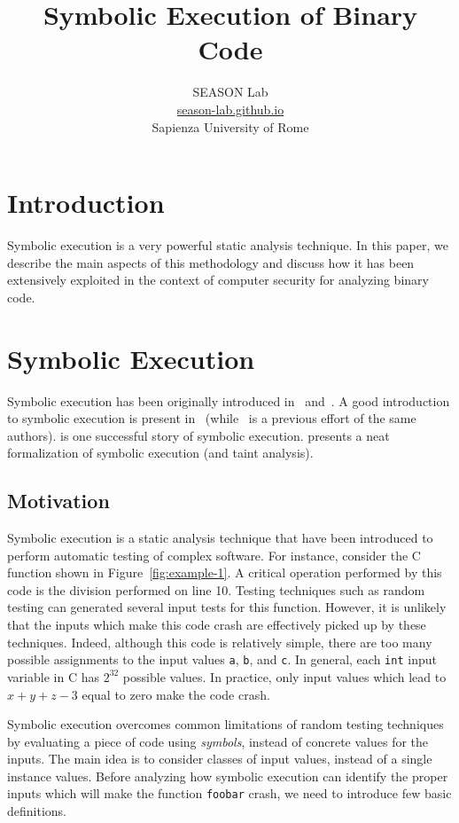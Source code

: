 \documentclass[10pt, a4paper]{article}
\title{Symbolic Execution of Binary Code}
\author{SEASON Lab  \\
\url{season-lab.github.io} \\
Sapienza University of Rome  \\
}
\begin{document}
\maketitle

\setcounter{tocdepth}{2}
\tableofcontents

\newpage
\section{Introduction}

Symbolic execution is a very powerful static analysis technique. In this paper, we describe the main aspects of this methodology and discuss how it has been extensively exploited in the context of computer security for analyzing binary code.

\section{Symbolic Execution}

Symbolic execution has been originally introduced in~\cite{K-ACM76} and~\cite{H-TSE77}. A good introduction to symbolic execution is present in~\cite{KLEE-OSDI08} (while~\cite{EXE-CCS06} is a previous effort of the same authors). \cite{SAGE-NDSS08} is one successful story of symbolic execution. \cite{SAB-SP10} presents a neat formalization of symbolic execution (and taint analysis).

\subsection{Motivation}

Symbolic execution is a static analysis technique that have been introduced to perform automatic testing of complex software. For instance, consider the C function shown in Figure~\ref{fig:example-1}. A critical operation performed by this code is the division performed on line 10. Testing techniques such as random testing can generated several input tests for this function. However, it is unlikely that the inputs which make this code crash are effectively picked up by these techniques. Indeed, although this code is relatively simple, there are too many possible assignments to the input values {\tt a}, {\tt b}, and {\tt c}. In general, each {\tt int} input variable in C has $2^{32}$ possible values. In practice, only input values which lead to $x + y + z - 3$ equal to zero make the code crash.

Symbolic execution overcomes common limitations of random testing techniques by evaluating a piece of code using {\em symbols}, instead of concrete values for the inputs. The main idea is to consider classes of input values, instead of a single instance values. Before analyzing how symbolic execution can identify the proper inputs which will make the function {\tt foobar} crash, we need to introduce few basic definitions.
\end{document}
